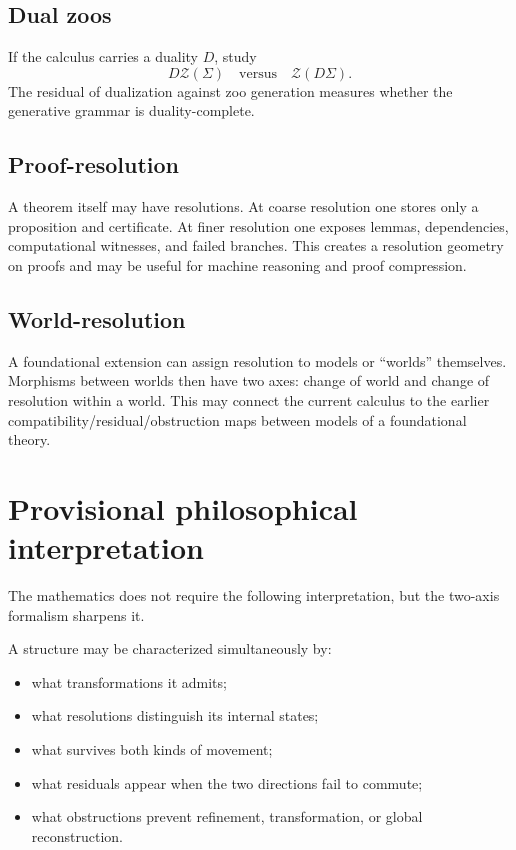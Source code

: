 \documentclass[11pt]{article}
\theoremstyle{definition}
\theoremstyle{remark}
\newcommand{\Zoo}{\mathcal Z}
\newcommand{\Seeds}{\Sigma}
\begin{document}
\subsection{Dual zoos}
If the calculus carries a duality $D$, study
\[
D\Zoo(\Seeds)
\quad\text{versus}\quad
\Zoo(D\Seeds).
\]
The residual of dualization against zoo generation measures whether the generative grammar is duality-complete.

\subsection{Proof-resolution}
A theorem itself may have resolutions. At coarse resolution one stores only a proposition and certificate. At finer resolution one exposes lemmas, dependencies, computational witnesses, and failed branches. This creates a resolution geometry on proofs and may be useful for machine reasoning and proof compression.

\subsection{World-resolution}
A foundational extension can assign resolution to models or ``worlds'' themselves. Morphisms between worlds then have two axes: change of world and change of resolution within a world. This may connect the current calculus to the earlier compatibility/residual/obstruction maps between models of a foundational theory.

\section{Provisional philosophical interpretation}

The mathematics does not require the following interpretation, but the two-axis formalism sharpens it.

A structure may be characterized simultaneously by:
\begin{itemize}
    \item what transformations it admits;
    \item what resolutions distinguish its internal states;
    \item what survives both kinds of movement;
    \item what residuals appear when the two directions fail to commute;
    \item what obstructions prevent refinement, transformation, or global reconstruction.
\end{itemize}
\end{document}
